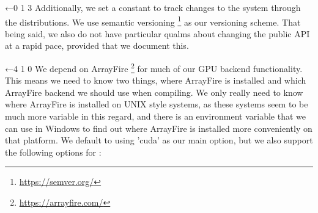 \documentclass{article}%
\begin{document}
\nwenddocs{}\endmoddef\nwstartdeflinemarkup{}\nwenddeflinemarkup
{}  ←0 1 3
\eatline
{}\nwendcode{}\nwdocspar
\noindent
Additionally, we set a {\Tt{}\nwendquote} constant to track changes to the 
system through the distributions.
We use semantic versioning%
\footnote{\href{https://semver.org/}{https://semver.org/}}
as our versioning scheme.
That being said, we also do not have particular qualms about changing
the public API at a rapid pace, provided that we document this.

\nwenddocs{}\plusendmoddef\nwstartdeflinemarkup{}\nwenddeflinemarkup
{}←4 1 0
\eatline
{}\nwendcode{}\nwdocspar
\noindent
We depend on ArrayFire%
\footnote{\href{https://arrayfire.com/}{https://arrayfire.com/}}
for much of our GPU backend functionality.
This means we need to know two things,
where ArrayFire is installed
and which ArrayFire backend we should use when compiling.
We only really need to know where ArrayFire is installed on UNIX
style systems, as these systems seem to be much more variable in 
this regard, and there is an environment variable that we can use 
in Windows to find out where ArrayFire is installed more conveniently
on that platform.
We default to using {\Tt{}'cuda'\nwendquote} as our main option, but we also 
support the following options for {\Tt{}\nwendquote}:
\end{document}
